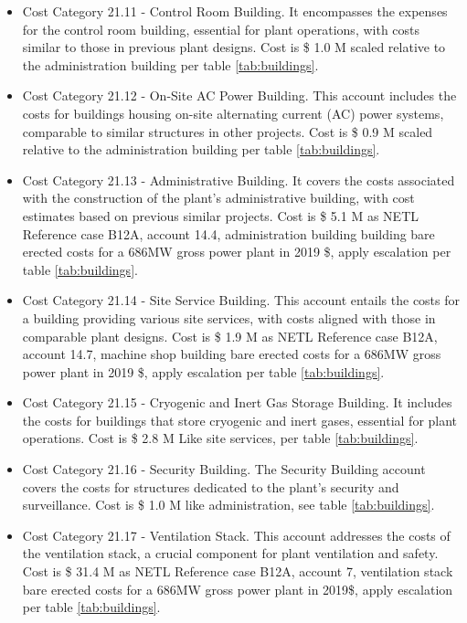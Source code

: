 \begin{itemize}
\item Cost Category 21.11 - Control Room Building. It encompasses the expenses for the control room building, essential for plant operations, with costs similar to those in previous plant designs.  Cost is \$ 1.0 M scaled relative to the administration building per table \ref{tab:buildings}. 
\item Cost Category 21.12 - On-Site AC Power Building. This account includes the costs for buildings housing on-site alternating current (AC) power systems, comparable to similar structures in other projects.  Cost is \$ 0.9 M scaled relative to the administration building per table \ref{tab:buildings}. 
\item Cost Category 21.13 - Administrative Building. It covers the costs associated with the construction of the plant’s administrative building, with cost estimates based on previous similar projects. Cost is \$ 5.1 M as NETL Reference case B12A, account 14.4, administration building building bare erected costs for a 686MW gross power plant in 2019 \$, apply escalation per table \ref{tab:buildings}. 
\item Cost Category 21.14 - Site Service Building. This account entails the costs for a building providing various site services, with costs aligned with those in comparable plant designs. Cost is \$ 1.9 M as NETL Reference case B12A, account 14.7, machine shop building bare erected costs for a 686MW gross power plant in 2019 \$, apply escalation per table \ref{tab:buildings}. 
\item Cost Category 21.15 - Cryogenic and Inert Gas Storage Building. It includes the costs for buildings that store cryogenic and inert gases, essential for plant operations.  Cost is \$ 2.8 M Like site services, per table \ref{tab:buildings}. 
\item Cost Category 21.16 - Security Building. The Security Building account covers the costs for structures dedicated to the plant’s security and surveillance. Cost is \$ 1.0 M like administration, see table \ref{tab:buildings}. 
\item Cost Category 21.17 - Ventilation Stack. This account addresses the costs of the ventilation stack, a crucial component for plant ventilation and safety. Cost is \$ 31.4 M as NETL Reference case B12A, account 7, ventilation stack bare erected costs for a 686MW gross power plant in 2019\$, apply escalation per table \ref{tab:buildings}.
\end{itemize}









